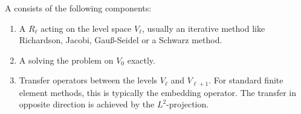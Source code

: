 \begin{definition}
  A  consists of the following components:
  \begin{enumerate}
  \item A  $R_\ell$ acting on the level space
    $V_\ell$, usually an iterative method like Richardson, Jacobi,
    Gauß-Seidel or a Schwarz method.
  \item A  solving the problem on $V_0$
    exactly.
  \item Transfer operators between the levels $V_{\ell}$ and
    $V_{\ell+1}$. For standard finite element methods, this is
    typically the embedding operator. The transfer in opposite
    direction is achieved by the $L^2$-projection.
  \end{enumerate}
  

\end{definition}
